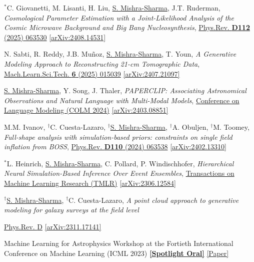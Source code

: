 \documentclass[letterpaper,11pt]{article}
\newenvironment{packed_itemize}{
\begin{itemize}[label=\raisebox{0.25ex}{\tiny$\bullet$}, topsep=0pt, partopsep=0pt]
  \setlength{\itemsep}{4.0pt}
  \setlength{\parskip}{0pt}
  \setlength{\parsep}{0pt}}{\end{itemize}
}
\newenvironment{packed_enumerate}[1][]{
\begin{etaremune}[#1]
  \setlength{\itemsep}{4.0pt}
  \setlength{\parskip}{0pt}
  \setlength{\parsep}{0pt}}{\end{etaremune}
}
\begin{document}
\begin{packed_enumerate}[start=63]
\item $^*$C. Giovanetti, M. Lisanti, H. Liu, \underline{S. Mishra-Sharma}, J.T. Ruderman,
\emph{Cosmological Parameter Estimation with a Joint-Likelihood Analysis of the Cosmic Microwave Background and Big Bang Nucleosynthesis},
\href{https://journals.aps.org/prd/abstract/10.1103/wspy-s948}{Phys.Rev. \textbf{D112} (2025) 063530}
\href{https://arxiv.org/abs/2408.14531}{[arXiv:2408.14531]}
  \item N. Sabti, R. Reddy, J.B. Muñoz, \underline{S. Mishra-Sharma}, T. Youn, \emph{A Generative Modeling Approach to Reconstructing 21-cm Tomographic Data}, \href{https://iopscience.iop.org/article/10.1088/2632-2153/adb19c}{Mach.Learn.Sci.Tech. \textbf{6} (2025) 015039} \href{https://arxiv.org/abs/2407.21097}{[arXiv:2407.21097]}
  \item \underline{S. Mishra-Sharma}, Y. Song, J. Thaler, \emph{PAPERCLIP: Associating Astronomical Observations and Natural Language with Multi-Modal Models}, \href{https://colmweb.org/AcceptedPapers.html}{Conference on Language Modeling (COLM 2024)} \href{https://arxiv.org/abs/2403.08851}{[arXiv:2403.08851]}
  \item M.M. Ivanov, $^{\dagger}$C. Cuesta-Lazaro, $^{\dagger}$\underline{S. Mishra-Sharma}, $^{\dagger}$A. Obuljen, $^{\dagger}$M. Toomey, \emph{Full-shape analysis with simulation-based priors: constraints on single field inflation from BOSS}, \href{https://journals.aps.org/prd/abstract/10.1103/PhysRevD.110.063538}{Phys.Rev. \textbf{D110} (2024) 063538} \href{https://arxiv.org/abs/2402.13310}{[arXiv:2402.13310]}
  \item $^*$L. Heinrich, \underline{S. Mishra-Sharma}, C. Pollard, P. Windischhofer, \emph{Hierarchical Neural Simulation-Based Inference Over Event Ensembles}, \href{https://openreview.net/forum?id=Jy2IgzjoFH&referrer=%5BAuthor%20Console%5D(%2Fgroup%3Fid%3DTMLR%2FAuthors%23your-submissions)}{Transactions on Machine Learning Research (TMLR)} \href{https://arxiv.org/abs/2306.12584}{[arXiv:2306.12584]}
  \item $^{\dagger}$\underline{S. Mishra-Sharma}, $^{\dagger}$C. Cuesta-Lazaro, \emph{A point cloud approach to generative modeling for galaxy surveys at the field level}
  \begin{packed_itemize}
      \item  \href{https://journals.aps.org/prd/abstract/10.1103/PhysRevD.109.123531}{Phys.Rev. {D}} \href{https://arxiv.org/abs/2311.17141}{[arXiv:2311.17141]}
      \item {Machine Learning for Astrophysics Workshop at the Fortieth International Conference on Machine Learning (ICML 2023)} \href{https://ml4astro.github.io/icml2023/}{\textbf{[Spotlight Oral]}} \href{https://ml4astro.github.io/icml2023/assets/59.pdf}{[Paper]} 

\end{packed_itemize}
\end{packed_enumerate}
\end{document}
